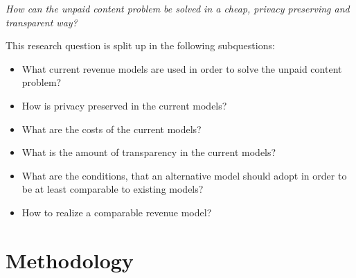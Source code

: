 \textit{How can the unpaid content problem be solved in a cheap, privacy preserving and transparent way?}
\vspace{1em}

\noindent This research question is split up in the following subquestions:

\begin{itemize}
  \item What current revenue models are used in order to solve the unpaid content problem?
  \item How is privacy preserved in the current models?
  \item What are the costs of the current models?
  \item What is the amount of transparency in the current models?
  \item What are the conditions, that an alternative model should adopt in order to be at least comparable to existing models?
  \item How to realize a comparable revenue model?
\end{itemize}

\section{Methodology}